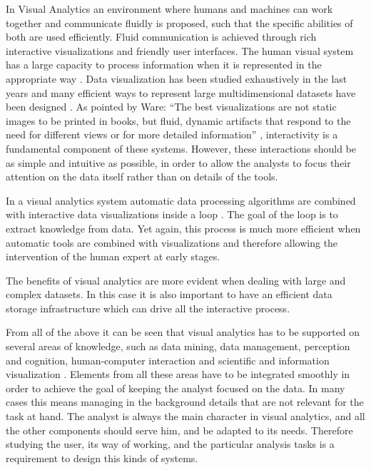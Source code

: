 In Visual Analytics an environment where humans and machines can work
together and communicate fluidly is proposed, such that the specific abilities of both are used
efficiently. Fluid communication is achieved through rich interactive
visualizations and friendly user interfaces.
The human visual system has a large capacity to process information when it is
represented in the appropriate way \autocite{ware_information_2004}. Data visualization has been studied
exhaustively in the last years and many efficient ways to represent large multidimensional
datasets have been designed \autocite{heer_tour_2010}. As
pointed by Ware: "`The best visualizations are not static images to be printed in books, but fluid,
dynamic artifacts that respond to the need for different views or for more detailed
information"' \autocite{ware_information_2004}, interactivity is a fundamental component of these systems. 
However,  these interactions should be
as simple and intuitive as possible, in order to allow the analysts to focus their attention on the
data itself \autocite{spence_information_2007} rather than on details of the tools. 

In a visual analytics system automatic data processing algorithms are combined with interactive data visualizations
inside a loop \autocite{keim_mastering_2010}. The goal of the loop is to extract knowledge from data. Yet again, this process
is much more efficient when automatic tools are combined with visualizations and therefore allowing the intervention of the
human expert at early stages. 

The benefits of visual analytics are more evident when dealing with large and complex datasets. In this case it is also important
to have an efficient data storage infrastructure which can drive all the interactive process. 

From all of the above it can be seen that visual analytics
has to be supported on several areas of knowledge, such as data mining, data management, perception and cognition, human-computer interaction and scientific and information visualization \autocite{keim_visual_2008}. Elements from all these areas have to be integrated smoothly in order to achieve the goal of keeping the analyst focused on the data. In many cases this means managing in the background details that are not relevant for the task at hand. The analyst is always the main character in visual analytics, and all the other components should serve him, and be adapted to its needs. Therefore studying the user, its way of working, and the particular analysis tasks is a requirement to design this kinds of systems. 


